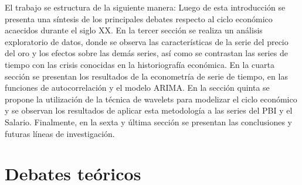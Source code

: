 \documentclass[a4paper]{article}
\begin{document}
El trabajo se estructura de la siguiente manera: Luego de esta introducción se presenta una síntesis de los principales debates respecto al ciclo económico acaecidos durante el siglo XX. En la tercer sección se realiza un análisis exploratorio de datos, donde se observa las características de la serie del precio del oro y los efectos sobre las demás series, así como se contrastan las series de tiempo con las crisis conocidas en la historiografía económica. En la cuarta sección se presentan los resultados de la econometría de serie de tiempo, en las funciones de autocorrelación y el modelo ARIMA. En la sección quinta se propone la utilización de la técnica de wavelets para modelizar el ciclo económico y se observan los resultados de aplicar esta metodología a las series del PBI y el Salario. Finalmente, en la sexta y última sección se presentan las conclusiones y futuras líneas de investigación.


\section{Debates teóricos}
\end{document}
